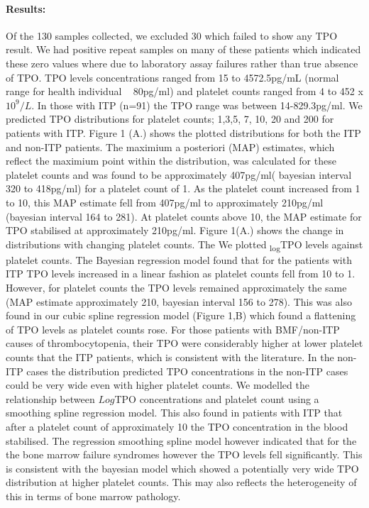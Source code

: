 \documentclass[11pt]{article}
\begin{document}
\paragraph{Results:} Of the 130 samples collected, we excluded 30 which failed to show any TPO result. We had positive repeat samples on many of these patients which indicated these zero values where due to laboratory assay failures rather than true absence of TPO. TPO levels concentrations ranged from 15 to 4572.5pg/mL (normal range for health individual ~ 80pg/ml) and platelet counts ranged from 4 to 452 x$10^9/L$. In those with ITP (n=91) the TPO range was between 14-829.3pg/ml. We predicted TPO distributions for platelet counts; 1,3,5, 7, 10, 20 and 200 for patients with ITP. Figure 1 (A.) shows the plotted distributions for both the ITP and non-ITP patients. The maximium a posteriori (MAP) estimates, which reflect the maximium point within the distribution, was calculated for these platelet counts and was found to be approximately 407pg/ml( bayesian interval 320 to 418pg/ml) for a platelet count of 1. As the platelet count increased from 1 to 10, this MAP estimate fell from 407pg/ml  to approximately 210pg/ml (bayesian interval 164 to 281). At platelet counts above 10, the MAP estimate for TPO stabilised at approximately 210pg/ml. Figure 1(A.) shows the change in distributions with changing platelet counts. The We plotted \textsubscript{log}TPO levels against platelet counts.  The Bayesian regression model found that for the patients with ITP TPO levels increased in a linear fashion as platelet counts fell from 10 to 1. However, for platelet counts  the TPO levels remained approximately the same (MAP estimate approximately 210, bayesian interval 156 to 278). This was also found in our cubic spline regression model (Figure 1,B) which found a flattening of TPO levels as platelet counts rose. For those patients with BMF/non-ITP causes of thrombocytopenia, their TPO were considerably higher at lower platelet counts that the ITP patients, which is consistent with the literature.  In the non-ITP cases the distribution predicted TPO concentrations in the non-ITP cases could be very wide even with higher platelet counts. We modelled the relationship between $Log$TPO concentrations and platelet count using a smoothing spline regression model. This also found in patients with ITP that after a platelet count of approximately 10 the TPO concentration in the blood stabilised. The regression smoothing spline model however indicated that for the the bone marrow failure syndromes however the TPO levels fell significantly. This is consistent with the bayesian model which showed a potentially very wide TPO distribution at higher platelet counts. This may also reflects the heterogeneity of this in terms of bone marrow pathology.
\end{document}
